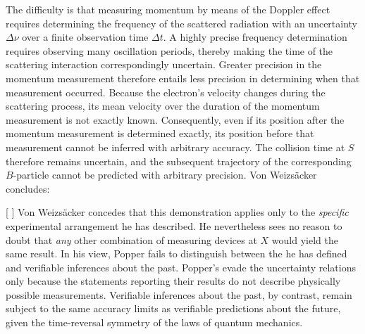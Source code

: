 \documentclass[final,12pt]{article}
\newcommand{\VW}{Von Weizsäcker\xspace}
\begin{document}
The difficulty is that measuring momentum by means of the Doppler effect requires determining the frequency of the scattered radiation with an uncertainty $\Delta \nu$ over a finite observation time $\Delta t$. A highly precise frequency determination requires observing many oscillation periods, thereby making the time of the scattering interaction correspondingly uncertain. Greater precision in the momentum measurement therefore entails less precision in determining when that measurement occurred. Because the electron's velocity changes during the scattering process, its mean velocity over the duration of the momentum measurement is not exactly known. Consequently, even if its position after the momentum measurement is determined exactly, its position before that measurement cannot be inferred with arbitrary accuracy. The collision time at $S$ therefore remains uncertain, and the subsequent trajectory of the corresponding $B$-particle cannot be predicted with arbitrary precision. \VW concludes:

[ \autocite[\VW in][808]{Popper1934}]
%
\VW concedes that this demonstration applies only to the \emph{specific} experimental arrangement he has described. He nevertheless sees no reason to doubt that \emph{any} other combination of measuring devices at $X$ would yield the same result. In his view, Popper fails to distinguish between the  he has defined and verifiable inferences about the past. Popper's  evade the uncertainty relations only because the statements reporting their results do not describe physically possible measurements. Verifiable inferences about the past, by contrast, remain subject to the same accuracy limits as verifiable predictions about the future, given the time-reversal symmetry of the laws of quantum mechanics.
\end{document}
